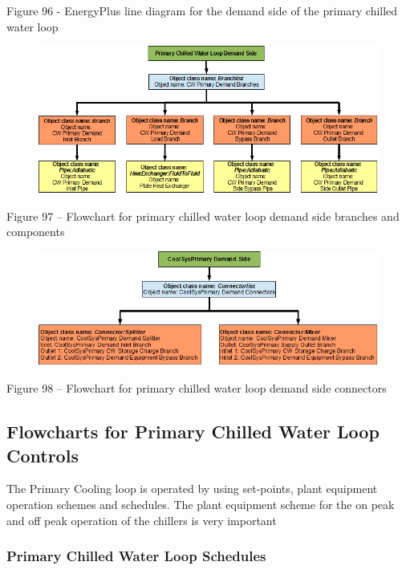 Figure 96 - EnergyPlus line diagram for the demand side of the primary chilled water loop

\begin{figure}[htbp]
\centering
\includegraphics{media/image097.png}
\caption{}
\end{figure}

Figure 97 -- Flowchart for primary chilled water loop demand side branches and components

\begin{figure}[htbp]
\centering
\includegraphics{media/image098.png}
\caption{}
\end{figure}

Figure 98 -- Flowchart for primary chilled water loop demand side connectors

\subsection{Flowcharts for Primary Chilled Water Loop Controls}\label{flowcharts-for-primary-chilled-water-loop-controls}

The Primary Cooling loop is operated by using set-points, plant equipment operation schemes and schedules. The plant equipment scheme for the on peak and off peak operation of the chillers is very important

\subsubsection{Primary Chilled Water Loop Schedules}\label{primary-chilled-water-loop-schedules}

